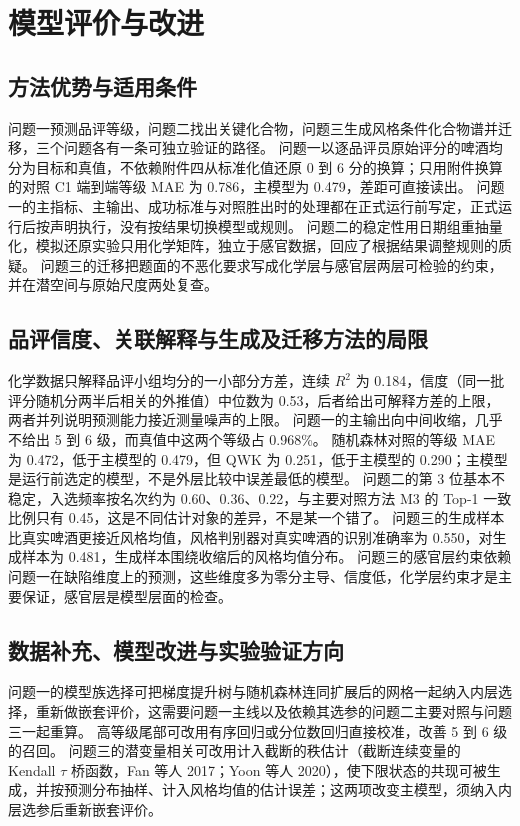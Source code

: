 \section{模型评价与改进}

\subsection{方法优势与适用条件}

问题一预测品评等级，问题二找出关键化合物，问题三生成风格条件化合物谱并迁移，三个问题各有一条可独立验证的路径。
问题一以逐品评员原始评分的啤酒均分为目标和真值，不依赖附件四从标准化值还原 0 到 6 分的换算；只用附件换算的对照 C1 端到端等级 MAE 为 0.786，主模型为 0.479，差距可直接读出。
问题一的主指标、主输出、成功标准与对照胜出时的处理都在正式运行前写定，正式运行后按声明执行，没有按结果切换模型或规则。
问题二的稳定性用日期组重抽量化，模拟还原实验只用化学矩阵，独立于感官数据，回应了根据结果调整规则的质疑。
问题三的迁移把题面的不恶化要求写成化学层与感官层两层可检验的约束，并在潜空间与原始尺度两处复查。

\subsection{品评信度、关联解释与生成及迁移方法的局限}

化学数据只解释品评小组均分的一小部分方差，连续 $R^2$ 为 0.184，信度（同一批评分随机分两半后相关的外推值）中位数为 0.53，后者给出可解释方差的上限，两者并列说明预测能力接近测量噪声的上限。
问题一的主输出向中间收缩，几乎不给出 5 到 6 级，而真值中这两个等级占 0.968\%。
随机森林对照的等级 MAE 为 0.472，低于主模型的 0.479，但 QWK 为 0.251，低于主模型的 0.290；主模型是运行前选定的模型，不是外层比较中误差最低的模型。
问题二的第 3 位基本不稳定，入选频率按名次约为 0.60、0.36、0.22，与主要对照方法 M3 的 Top-1 一致比例只有 0.45，这是不同估计对象的差异，不是某一个错了。
问题三的生成样本比真实啤酒更接近风格均值，风格判别器对真实啤酒的识别准确率为 0.550，对生成样本为 0.481，生成样本围绕收缩后的风格均值分布。
问题三的感官层约束依赖问题一在缺陷维度上的预测，这些维度多为零分主导、信度低，化学层约束才是主要保证，感官层是模型层面的检查。

\subsection{数据补充、模型改进与实验验证方向}

问题一的模型族选择可把梯度提升树与随机森林连同扩展后的网格一起纳入内层选择，重新做嵌套评价，这需要问题一主线以及依赖其选参的问题二主要对照与问题三一起重算。
高等级尾部可改用有序回归或分位数回归直接校准，改善 5 到 6 级的召回。
问题三的潜变量相关可改用计入截断的秩估计（截断连续变量的 Kendall $\tau$ 桥函数，Fan 等人 2017；Yoon 等人 2020），使下限状态的共现可被生成，并按预测分布抽样、计入风格均值的估计误差；这两项改变主模型，须纳入内层选参后重新嵌套评价。
